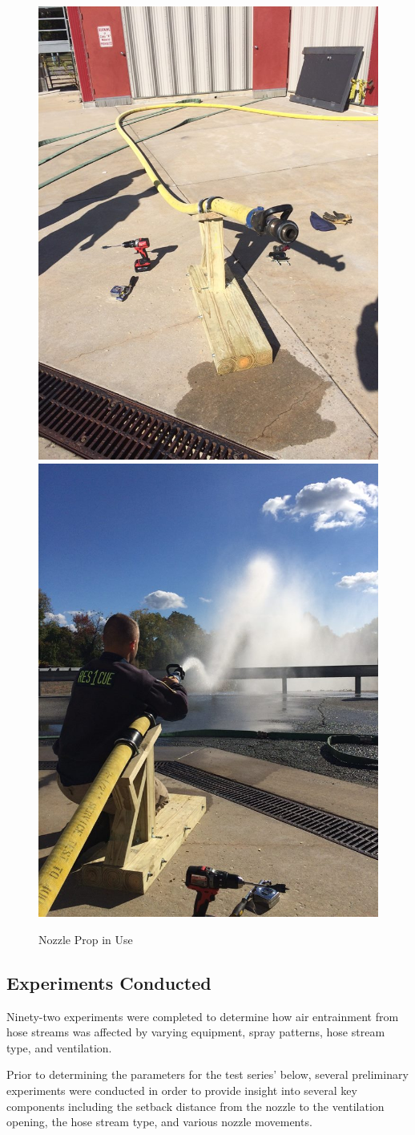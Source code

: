 \documentclass{article}
\begin{document}
\begin{figure}[!ht]
\centering
\includegraphics[width=.4\columnwidth]{Figures/Air_Entrainment/Old_Gib} 
\includegraphics[width=.4\columnwidth]{Figures/Air_Entrainment/Old_Gib_1} \\
\caption{Nozzle Prop in Use}
\label{fig:Nozzle_Prop_in_Use}
\end{figure}

\subsection{Experiments Conducted}

Ninety-two experiments were completed to determine how air entrainment from hose streams was affected by varying equipment, spray patterns, hose stream type, and ventilation.

Prior to determining the parameters for the test series' below, several preliminary experiments were conducted in order to provide insight into several key components including the setback distance from the nozzle to the ventilation opening, the hose stream type, and various nozzle movements.
\end{document}
